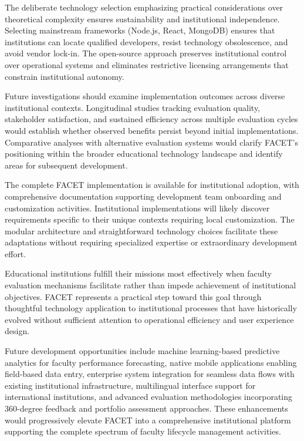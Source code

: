 \documentclass[conference]{IEEEtran}
\begin{document}
The deliberate technology selection emphasizing practical considerations over theoretical complexity ensures sustainability and institutional independence. Selecting mainstream frameworks (Node.js, React, MongoDB) ensures that institutions can locate qualified developers, resist technology obsolescence, and avoid vendor lock-in. The open-source approach preserves institutional control over operational systems and eliminates restrictive licensing arrangements that constrain institutional autonomy.

Future investigations should examine implementation outcomes across diverse institutional contexts. Longitudinal studies tracking evaluation quality, stakeholder satisfaction, and sustained efficiency across multiple evaluation cycles would establish whether observed benefits persist beyond initial implementations. Comparative analyses with alternative evaluation systems would clarify FACET's positioning within the broader educational technology landscape and identify areas for subsequent development.

The complete FACET implementation is available for institutional adoption, with comprehensive documentation supporting development team onboarding and customization activities. Institutional implementations will likely discover requirements specific to their unique contexts requiring local customization. The modular architecture and straightforward technology choices facilitate these adaptations without requiring specialized expertise or extraordinary development effort.

Educational institutions fulfill their missions most effectively when faculty evaluation mechanisms facilitate rather than impede achievement of institutional objectives. FACET represents a practical step toward this goal through thoughtful technology application to institutional processes that have historically evolved without sufficient attention to operational efficiency and user experience design.

Future development opportunities include machine learning-based predictive analytics for faculty performance forecasting, native mobile applications enabling field-based data entry, enterprise system integration for seamless data flows with existing institutional infrastructure, multilingual interface support for international institutions, and advanced evaluation methodologies incorporating 360-degree feedback and portfolio assessment approaches. These enhancements would progressively elevate FACET into a comprehensive institutional platform supporting the complete spectrum of faculty lifecycle management activities.
\end{document}
